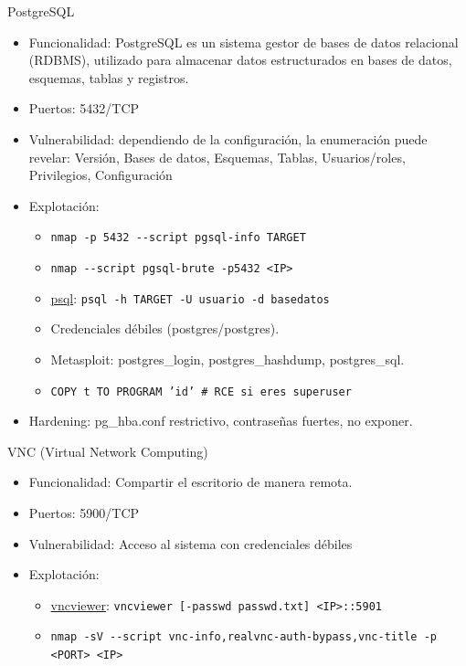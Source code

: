 \documentclass[aspectratio=169,11pt]{beamer}
\newcommand{\cmd}[1]{\texttt{#1}}
\begin{document}
\begin{frame}[allowframebreaks]{PostgreSQL}
\small
  \begin{itemize}
  \item Funcionalidad: PostgreSQL es un sistema gestor de bases de datos relacional (RDBMS), utilizado para almacenar datos estructurados en bases de datos, esquemas, tablas y registros.
  \item Puertos: 5432/TCP
  \item Vulnerabilidad: dependiendo de la configuración, la enumeración puede revelar: Versión, Bases de datos, Esquemas, Tablas, Usuarios/roles, Privilegios, Configuración
  \item Explotación:
    \begin{itemize}
      \item \cmd{nmap -p 5432 -{}-script pgsql-info TARGET}
      \item \cmd{nmap -{}-script pgsql-brute -p5432 <IP>}
      \item \href{https://www.postgresql.org/docs/current/app-psql.html}{psql}: \cmd{psql -h TARGET -U usuario -d basedatos}
      \item Credenciales débiles (postgres/postgres). 
      \item Metasploit: postgres\_login, postgres\_hashdump, postgres\_sql.
      \item \cmd{COPY t TO PROGRAM 'id' \# RCE si eres superuser}
    \end{itemize}
  \item Hardening: pg\_hba.conf restrictivo, contraseñas fuertes, no exponer.
  \end{itemize}
\end{frame}


\begin{frame}[allowframebreaks]{VNC (Virtual Network Computing)}
\small
  \begin{itemize}
  \item Funcionalidad: Compartir el escritorio de manera remota.
  \item Puertos: 5900/TCP
  \item Vulnerabilidad: Acceso al sistema con credenciales débiles
  \item Explotación:
    \begin{itemize}
    \item \href{https://tigervnc.org/}{vncviewer}: \cmd{vncviewer [-passwd passwd.txt] <IP>::5901}
    \item \cmd{nmap -sV -{}-script vnc-info,realvnc-auth-bypass,vnc-title -p <PORT> <IP>}
    \end{itemize}
  \end{itemize}
\end{frame}
\end{document}
